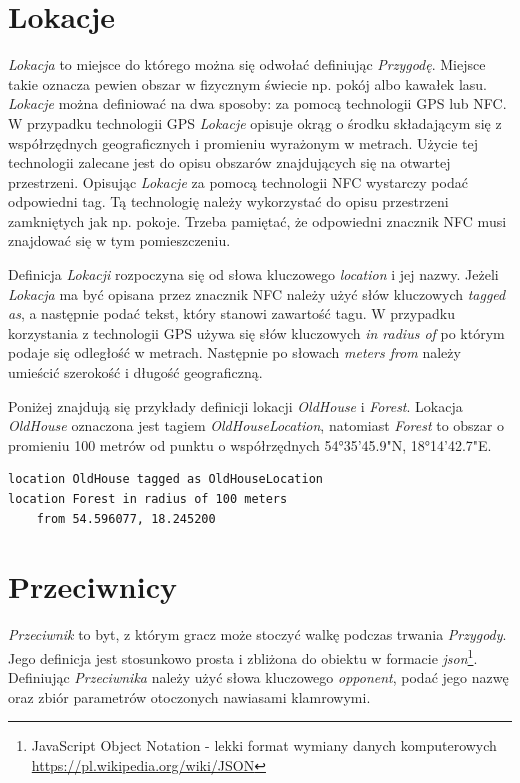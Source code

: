 \documentclass[openright]{xmgr}
\begin{document}
\section{Lokacje}
\textit{Lokacja} to miejsce do którego można się odwołać definiując \textit{Przygodę}. Miejsce takie oznacza pewien obszar w fizycznym świecie np. pokój albo kawałek lasu. \textit{Lokacje} można definiować na dwa sposoby: za pomocą technologii GPS lub NFC. 
W przypadku technologii GPS \textit{Lokacje} opisuje okrąg o środku składającym się z współrzędnych geograficznych i promieniu wyrażonym w metrach. Użycie tej technologii zalecane jest do opisu obszarów znajdujących się na otwartej przestrzeni.
Opisując \textit{Lokacje} za pomocą technologii NFC wystarczy podać odpowiedni tag. Tą technologię należy wykorzystać do opisu przestrzeni zamkniętych jak np. pokoje. Trzeba pamiętać, że odpowiedni znacznik NFC musi znajdować się w tym pomieszczeniu.

Definicja \textit{Lokacji} rozpoczyna się od słowa kluczowego \textit{location} i jej nazwy. Jeżeli \textit{Lokacja} ma być opisana przez znacznik NFC należy użyć słów kluczowych \textit{tagged as}, a następnie podać tekst, który stanowi zawartość tagu. W przypadku korzystania z technologii GPS używa się słów kluczowych \textit{in radius of} po którym podaje się odległość w metrach. Następnie po słowach \textit{meters from} należy umieścić szerokość i długość geograficzną.

Poniżej znajdują się przykłady definicji lokacji \textit{OldHouse} i \textit{Forest}. Lokacja \textit{OldHouse} oznaczona jest tagiem \textit{OldHouseLocation}, natomiast \textit{Forest} to obszar o promieniu 100 metrów od punktu o współrzędnych 54°35'45.9"N, 18°14'42.7"E.
\begin{verbatim}
location OldHouse tagged as OldHouseLocation
location Forest in radius of 100 meters 
	from 54.596077, 18.245200
\end{verbatim}

\section{Przeciwnicy}

\textit{Przeciwnik} to byt, z którym gracz może stoczyć walkę podczas trwania \textit{Przygody}. Jego definicja jest stosunkowo prosta i zbliżona do obiektu w formacie \textit{json}\footnote{JavaScript Object Notation - lekki format wymiany danych komputerowych \url{https://pl.wikipedia.org/wiki/JSON}}. Definiując \textit{Przeciwnika} należy użyć słowa kluczowego \textit{opponent}, podać jego nazwę oraz zbiór parametrów otoczonych nawiasami klamrowymi.
\end{document}
